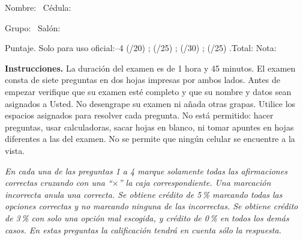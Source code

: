 \documentclass[11pt]{article}
\begin{document}
\examheader

\vspace{4pt}
\noindent Nombre: \dotfill\ Cédula: \dotfill

\vspace{4pt}
\noindent Grupo: \dotfill\ Salón: \dotfill

\vspace{4pt}
\noindent Puntaje. Solo para uso oficial:--4 (/20) \dotfill; (/25) \dotfill; (/30) \dotfill; (/25) \dotfill.\quad Total: \dotfill\quad Nota: \dotfill

\vspace{6pt}
\noindent\textbf{Instrucciones.} La duración del examen es de 1 hora y 45 minutos. El examen consta de siete preguntas en dos hojas impresas por ambos lados. Antes de empezar verifique que su examen esté completo y que su nombre y datos sean asignados a Usted. No desengrape su examen ni añada otras grapas. Utilice los espacios asignados para resolver cada pregunta. No está permitido: hacer preguntas, usar calculadoras, sacar hojas en blanco, ni tomar apuntes en hojas diferentes a las del examen. No se permite que ningún celular se encuentre a la vista.

\vspace{8pt}
\noindent\textit{En cada una de las preguntas 1 a 4 marque solamente todas las afirmaciones correctas cruzando con una ``$\times$'' la caja correspondiente. Una marcación incorrecta anula una correcta. Se obtiene crédito de 5\,\% marcando todas las opciones correctas y no marcando ninguna de las incorrectas. Se obtiene crédito de 3\,\% con solo una opción mal escogida, y crédito de 0\,\% en todos los demás casos. En estas preguntas la calificación tendrá en cuenta sólo la respuesta.}
\end{document}
